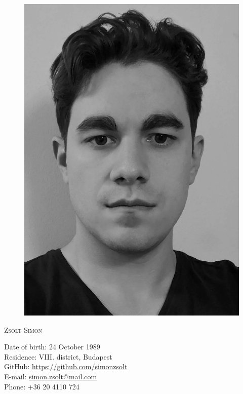 

\setlength{\parindent}{0em}

\def \leftHeader{CV}
\def \rightHeader{Zsolt Simon}
\def \position{}

\setmainfont[Mapping=tex-text,Numbers=OldStyle,Ligatures=TeX]{TeX Gyre Termes}



\begin{figure}
  \flushright
  \includegraphics[scale=0.4]{portrait_mono} 
\end{figure}

\begin{Large}
  \textsc{Zsolt Simon}
  \vspace{1em}
\end{Large}

Date of birth: 24 October 1989\\
Residence: VIII. district, Budapest\\ 
GitHub: \url{https://github.com/simonzsolt}\\
E-mail: \url{simon.zsolt@mail.com}\\
Phone: +36 20 4110 724

